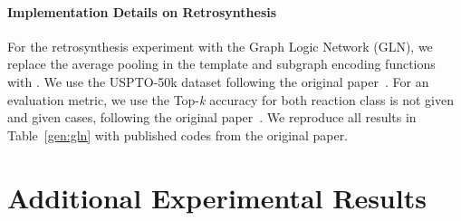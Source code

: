 \documentclass{article} \usepackage{iclr2021_conference,times}
\begin{document}
\paragraph{Implementation Details on Retrosynthesis}
For the retrosynthesis experiment with the Graph Logic Network (GLN), we replace the average pooling in the template and subgraph encoding functions with . We use the USPTO-50k dataset following the original paper~\citep{GLN}. For an evaluation metric, we use the Top-\textit{k} accuracy for both reaction class is not given and given cases, following the original paper~\citep{GLN}. We reproduce all results in Table~\ref{gen:gln} with published codes from the original paper. 


\section{Additional Experimental Results}
\end{document}
